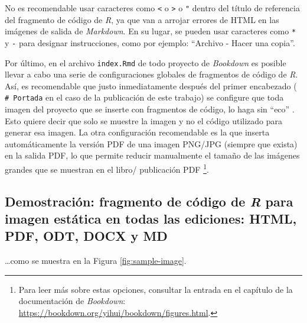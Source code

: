 \documentclass[
]{book}
\begin{document}
No es recomendable usar caracteres como \texttt{\textless{}} o \texttt{\textgreater{}} o \texttt{"} dentro del título de referencia del fragmento de código de \emph{R}, ya que van a arrojar errores de HTML en las imágenes de salida de \emph{Markdown}. En su lugar, se pueden usar caracteres como \texttt{*} y \texttt{-} para designar instrucciones, como por ejemplo: ``Archivo - Hacer una copia''.

Por último, en el archivo \texttt{index.Rmd} de todo proyecto de \emph{Bookdown} es posible llevar a cabo una serie de configuraciones globales de fragmentos de código de \emph{R}. Así, es recomendable que justo inmediatamente después del primer encabezado ( \texttt{\#\ Portada} en el caso de la publicación de este trabajo) se configure que toda imagen del proyecto que se inserte con fragmentos de código, lo haga sin ``eco'' . Esto quiere decir que solo se muestre la imagen y no el código utilizado para generar esa imagen. La otra configuración recomendable es la que inserta automáticamente la versión PDF de una imagen PNG/JPG (siempre que exista) en la salida PDF, lo que permite reducir manualmente el tamaño de las imágenes grandes que se muestran en el libro/ publicación PDF \footnote{Para leer más sobre estas opciones, consultar la entrada en el capítulo de la documentación de \emph{Bookdown}: \url{https://bookdown.org/yihui/bookdown/figures.html}.}.

\hypertarget{demostraciuxf3n-fragmento-de-cuxf3digo-de-r-para-imagen-estuxe1tica-en-todas-las-ediciones-html-pdf-odt-docx-y-md}{%
\subsection{\texorpdfstring{Demostración: fragmento de código de \emph{R} para imagen estática en todas las ediciones: HTML, PDF, ODT, DOCX y MD}{Demostración: fragmento de código de R para imagen estática en todas las ediciones: HTML, PDF, ODT, DOCX y MD}}\label{demostraciuxf3n-fragmento-de-cuxf3digo-de-r-para-imagen-estuxe1tica-en-todas-las-ediciones-html-pdf-odt-docx-y-md}}

\ldots como se muestra en la Figura \ref{fig:sample-image}.
\end{document}
